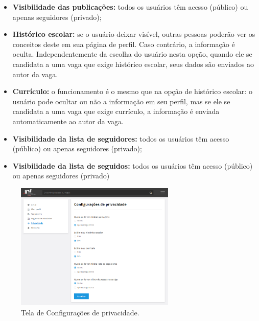 \documentclass[cic,tc]{iiufrgs}
\begin{document}
\begin{itemize}
    \item \textbf{Visibilidade das publicações:} todos os usuários têm acesso (público) ou apenas seguidores (privado);
    
    \item \textbf{Histórico escolar:} se o usuário deixar visível, outras pessoas poderão ver os conceitos deste em sua página de perfil. Caso contrário, a informação é oculta. Independentemente da escolha do usuário nesta opção, quando ele se candidata a uma vaga que exige histórico escolar, seus dados são enviados ao autor da vaga.
    
    \item \textbf{Currículo:} o funcionamento é o mesmo que na opção de histórico escolar: o usuário pode ocultar ou não a informação em seu perfil, mas se ele se candidata a uma vaga que exige currículo, a informação é enviada automaticamente ao autor da vaga.
    
    \item \textbf{Visibilidade da lista de seguidores:} todos os usuários têm acesso (público) ou apenas seguidores (privado);
    
    \item \textbf{Visibilidade da lista de seguidos:} todos os usuários têm acesso (público) ou apenas seguidores (privado)
\end{itemize}

\begin{figure}[ht]
    \caption{Tela de Configurações de privacidade.}
        \begin{center}
            \includegraphics[width=0.68\textwidth]{figuras/config_02.png}
        \end{center}
    \label{telaConfigPrivacidade}
\end{figure}
\end{document}

